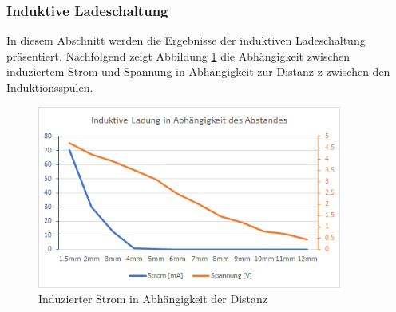 \subsubsection*{Induktive Ladeschaltung}\label{sec:batterie}
In diesem Abschnitt werden die Ergebnisse der induktiven Ladeschaltung präsentiert. Nachfolgend zeigt Abbildung \ref{fig:InduzierterStrom} die Abhängigkeit zwischen induziertem Strom und Spannung in Abhängigkeit zur Distanz z zwischen den Induktionsspulen.

\begin{figure}[H]
	\begin{center}
		\includegraphics[width=100mm]{data/InduktiveLadung.png}
		\caption[Induzierter Strom in Abhängigkeit der Distanz]{Induzierter Strom in Abhängigkeit der Distanz} %
		\label{fig:InduzierterStrom}
	\end{center}
\end{figure}

